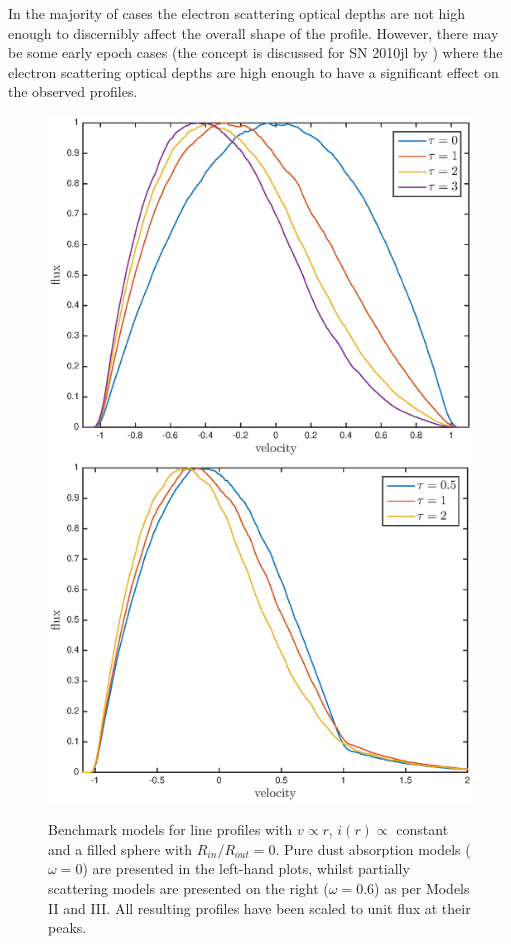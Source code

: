\documentclass[useAMS,usenatbib,usegraphicx]{mnras}
\begin{document}
In the majority of cases the electron scattering optical depths are not high 
enough to discernibly affect the overall shape of the profile.  However, 
there may be some early epoch cases (the concept is discussed for SN 2010jl 
by \citet{Fransson2014}) where the electron scattering optical depths are high enough to 
have a significant effect on the observed profiles.  

\begin{figure}
\includegraphics[trim =33 10 45 15,clip=true,scale=0.51]{params/opt_thick_w0} 
\includegraphics[trim =33 10 45 15,clip=true,scale=0.51]{params/opt_thick_w0_6}  
\caption{Benchmark models for line profiles  with $v \propto r$, $i(r) \propto$ constant and a filled sphere with $R_{in}/R_{out}=0$.  Pure dust absorption models ($\omega = 0$) are presented in the left-hand plots, whilst partially scattering models are presented on the right ($\omega = 0.6$) as per \citet{Lucy1989} Models II and III. All resulting profiles have been scaled to unit flux at their peaks.}
\label{fig:Lucy}
\end{figure}
\end{document}
